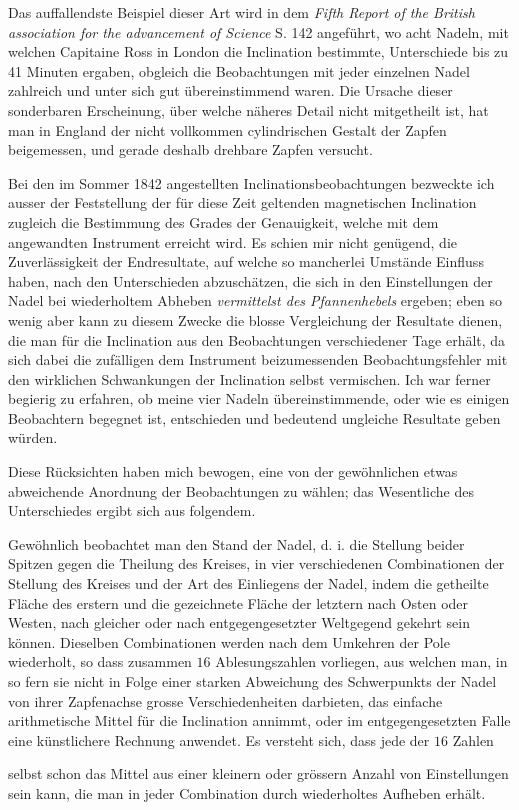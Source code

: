 \expandafter\def\csname HistoricalNoteText457\endcsname{Das auffallendste Beispiel dieser Art wird in dem \textit{Fifth Report of the British association for the advancement of Science} S. 142 angeführt, wo acht Nadeln, mit welchen Capitaine Ross in London die Inclination bestimmte, Unterschiede bis zu 41 Minuten ergaben, obgleich die Beobachtungen mit jeder einzelnen Nadel zahlreich und unter sich gut übereinstimmend waren. Die Ursache dieser sonderbaren Erscheinung, über welche näheres Detail nicht mitgetheilt ist, hat man in England der nicht vollkommen cylindrischen Gestalt der Zapfen beigemessen, und gerade deshalb drehbare Zapfen versucht.}%
\par\clearpage
{}
Bei den im Sommer 1842 angestellten Inclinationsbeobachtungen be\-zweckte ich ausser der Feststellung der für diese Zeit geltenden magnetischen Inclination zugleich die Bestimmung des Grades der Genauigkeit, welche mit dem angewandten Instrument erreicht wird. Es schien mir nicht genügend, die Zuverlässigkeit der Endresultate, auf welche so mancherlei Umstände Einfluss haben, nach den Unterschieden abzuschätzen, die sich in den Einstellungen der Nadel bei wiederholtem Abheben \textit{vermittelst des Pfannenhebels} ergeben; eben so wenig aber kann zu diesem Zwecke die blosse Vergleichung der Resultate dienen, die man für die Inclination aus den Beobachtungen verschiedener Tage erhält, da sich dabei die zufälligen dem Instrument beizumessenden Beobachtungsfehler mit den wirklichen Schwankungen der Inclination selbst vermischen. Ich war ferner begierig zu erfahren, ob meine vier Nadeln übereinstimmende, oder wie es einigen Beobachtern begegnet ist, entschieden und bedeutend ungleiche Resultate geben würden.

Diese Rücksichten haben mich bewogen, eine von der gewöhnlichen etwas abweichende Anordnung der Beobachtungen zu wählen; das Wesentliche des Unterschiedes ergibt sich aus folgendem.

Gewöhnlich beobachtet man den Stand der Nadel, d. i. die Stellung beider Spitzen gegen die Theilung des Kreises, in vier verschiedenen Combinationen der Stellung des Kreises und der Art des Einliegens der Nadel, indem die getheilte Fläche des erstern und die gezeichnete Fläche der letztern nach Osten oder Westen, nach gleicher oder nach entgegengesetzter Weltgegend gekehrt sein können. Dieselben Combinationen werden nach dem Umkehren der Pole wiederholt, so dass zusammen $16$ Ablesungszahlen vorliegen, aus welchen man, in so fern sie nicht in Folge einer starken Abweichung des Schwerpunkts der Nadel von ihrer Zapfenachse grosse Verschiedenheiten darbieten, das einfache arithmetische Mittel für die Inclination annimmt, oder im entgegengesetzten Falle eine künstlichere Rechnung anwendet. Es versteht sich, dass jede der $16$ Zahlen
\par\GaussVSourceGathering{57\textsuperscript{*}}
\par\clearpage
{}
\noindent selbst schon das Mittel aus einer kleinern oder grössern Anzahl von Einstellungen sein kann, die man in jeder Combination durch wiederholtes Aufheben erhält.

